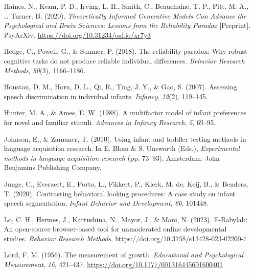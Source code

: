 \documentclass[
  man,floatsintext]{apa6}
\newlength{\cslhangindent}
\newlength{\cslentryspacingunit} %
\newenvironment{CSLReferences}[2] %
 {%
  \setlength{\parindent}{0pt}
  \ifodd #1
  \let\oldpar\par
  \def\par{\hangindent=\cslhangindent\oldpar}
  \fi
  \setlength{\parskip}{#2\cslentryspacingunit}
 }%
 {}
\begin{document}
\begin{CSLReferences}{1}{0}
\leavevmode{}%
Haines, N., Kvam, P. D., Irving, L. H., Smith, C., Beauchaine, T. P., Pitt, M. A., \ldots{} Turner, B. (2020). \emph{Theoretically {Informed} {Generative} {Models} {Can} {Advance} the {Psychological} and {Brain} {Sciences}: {Lessons} from the {Reliability} {Paradox}} {[}Preprint{]}. PsyArXiv. \url{https://doi.org/10.31234/osf.io/xr7y3}

\leavevmode{}%
Hedge, C., Powell, G., \& Sumner, P. (2018). The reliability paradox: Why robust cognitive tasks do not produce reliable individual differences. \emph{Behavior Research Methods}, \emph{50}(3), 1166--1186.

\leavevmode{}%
Houston, D. M., Horn, D. L., Qi, R., Ting, J. Y., \& Gao, S. (2007). Assessing speech discrimination in individual infants. \emph{Infancy}, \emph{12}(2), 119--145.

\leavevmode{}%
Hunter, M. A., \& Ames, E. W. (1988). A multifactor model of infant preferences for novel and familiar stimuli. \emph{Advances in Infancy Research}, \emph{5}, 69--95.

\leavevmode{}%
Johnson, E., \& Zamuner, T. (2010). Using infant and toddler testing methods in language acquisition research. In E. Blom \& S. Unsworth (Eds.), \emph{Experimental methods in language acquisition research} (pp. 73--93). Amsterdam: John Benjamins Publishing Company.

\leavevmode{}%
Junge, C., Everaert, E., Porto, L., Fikkert, P., Klerk, M. de, Keij, B., \& Benders, T. (2020). Contrasting behavioral looking procedures: A case study on infant speech segmentation. \emph{Infant Behavior and Development}, \emph{60}, 101448.

\leavevmode{}%
Lo, C. H., Hermes, J., Kartushina, N., Mayor, J., \& Mani, N. (2023). E-{Babylab}: {An} open-source browser-based tool for unmoderated online developmental studies. \emph{Behavior Research Methods}. \url{https://doi.org/10.3758/s13428-023-02200-7}

\leavevmode{}%
Lord, F. M. (1956). The measurement of growth. \emph{Educational and Psychological Measurement}, \emph{16}, 421--437. \url{https://doi.org/10.1177/001316445601600401}


\end{CSLReferences}
\end{document}
